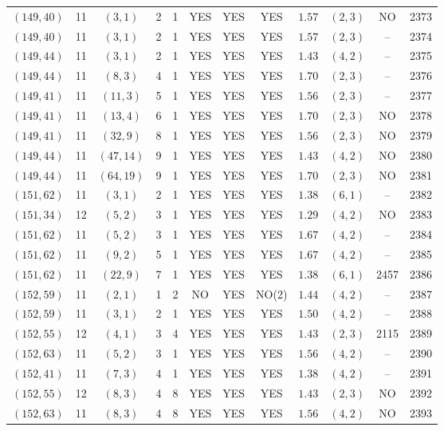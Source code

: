 \begin{longtable}{|c|c|c|c|c|c|c|c|c|c|c|c|}
$(149,40)$ & 11 & $(3,1)$ & 2 & 1 & YES & YES & YES & $1.57$ & $(2,3)$ & NO & 2373\\
$(149,40)$ & 11 & $(3,1)$ & 2 & 1 & YES & YES & YES & $1.57$ & $(2,3)$ & -- & 2374\\
$(149,44)$ & 11 & $(3,1)$ & 2 & 1 & YES & YES & YES & $1.43$ & $(4,2)$ & -- & 2375\\
$(149,44)$ & 11 & $(8,3)$ & 4 & 1 & YES & YES & YES & $1.70$ & $(2,3)$ & -- & 2376\\
$(149,41)$ & 11 & $(11,3)$ & 5 & 1 & YES & YES & YES & $1.56$ & $(2,3)$ & -- & 2377\\
$(149,41)$ & 11 & $(13,4)$ & 6 & 1 & YES & YES & YES & $1.70$ & $(2,3)$ & NO & 2378\\
$(149,41)$ & 11 & $(32,9)$ & 8 & 1 & YES & YES & YES & $1.56$ & $(2,3)$ & NO & 2379\\
$(149,44)$ & 11 & $(47,14)$ & 9 & 1 & YES & YES & YES & $1.43$ & $(4,2)$ & NO & 2380\\
$(149,44)$ & 11 & $(64,19)$ & 9 & 1 & YES & YES & YES & $1.70$ & $(2,3)$ & NO & 2381\\
$(151,62)$ & 11 & $(3,1)$ & 2 & 1 & YES & YES & YES & $1.38$ & $(6,1)$ & -- & 2382\\
$(151,34)$ & 12 & $(5,2)$ & 3 & 1 & YES & YES & YES & $1.29$ & $(4,2)$ & NO & 2383\\
$(151,62)$ & 11 & $(5,2)$ & 3 & 1 & YES & YES & YES & $1.67$ & $(4,2)$ & -- & 2384\\
$(151,62)$ & 11 & $(9,2)$ & 5 & 1 & YES & YES & YES & $1.67$ & $(4,2)$ & -- & 2385\\
$(151,62)$ & 11 & $(22,9)$ & 7 & 1 & YES & YES & YES & $1.38$ & $(6,1)$ & 2457 & 2386\\
$(152,59)$ & 11 & $(2,1)$ & 1 & 2 & NO & YES & NO(2) & $1.44$ & $(4,2)$ & -- & 2387\\
$(152,59)$ & 11 & $(3,1)$ & 2 & 1 & YES & YES & YES & $1.50$ & $(4,2)$ & -- & 2388\\
$(152,55)$ & 12 & $(4,1)$ & 3 & 4 & YES & YES & YES & $1.43$ & $(2,3)$ & 2115 & 2389\\
$(152,63)$ & 11 & $(5,2)$ & 3 & 1 & YES & YES & YES & $1.56$ & $(4,2)$ & -- & 2390\\
$(152,41)$ & 11 & $(7,3)$ & 4 & 1 & YES & YES & YES & $1.38$ & $(4,2)$ & -- & 2391\\
$(152,55)$ & 12 & $(8,3)$ & 4 & 8 & YES & YES & YES & $1.43$ & $(2,3)$ & NO & 2392\\
$(152,63)$ & 11 & $(8,3)$ & 4 & 8 & YES & YES & YES & $1.56$ & $(4,2)$ & NO & 2393\\

\end{longtable}
